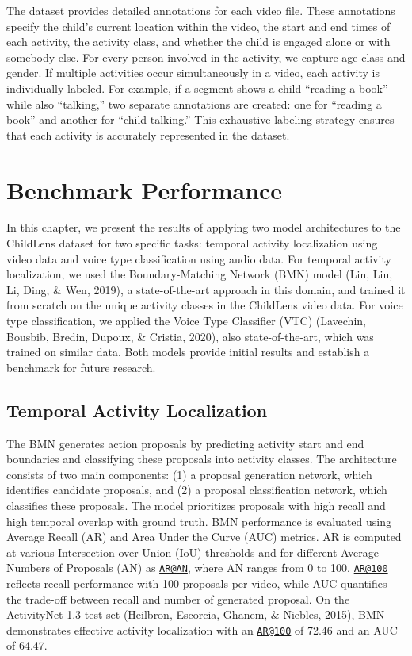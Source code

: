 \documentclass[
  man,floatsintext]{apa6}
\begin{document}
The dataset provides detailed annotations for each video file. These annotations specify the child's current location within the video, the start and end times of each activity, the activity class, and whether the child is engaged alone or with somebody else. For every person involved in the activity, we capture age class and gender. If multiple activities occur simultaneously in a video, each activity is individually labeled. For example, if a segment shows a child ``reading a book'' while also ``talking,'' two separate annotations are created: one for ``reading a book'' and another for ``child talking.'' This exhaustive labeling strategy ensures that each activity is accurately represented in the dataset.

\section{Benchmark Performance}\label{benchmark-performance}

In this chapter, we present the results of applying two model architectures to the ChildLens dataset for two specific tasks: temporal activity localization using video data and voice type classification using audio data. For temporal activity localization, we used the Boundary-Matching Network (BMN) model (Lin, Liu, Li, Ding, \& Wen, 2019), a state-of-the-art approach in this domain, and trained it from scratch on the unique activity classes in the ChildLens video data. For voice type classification, we applied the Voice Type Classifier (VTC) (Lavechin, Bousbib, Bredin, Dupoux, \& Cristia, 2020), also state-of-the-art, which was trained on similar data. Both models provide initial results and establish a benchmark for future research.

\subsection{Temporal Activity Localization}\label{temporal-activity-localization}

The BMN generates action proposals by predicting activity start and end boundaries and classifying these proposals into activity classes. The architecture consists of two main components: (1) a proposal generation network, which identifies candidate proposals, and (2) a proposal classification network, which classifies these proposals. The model prioritizes proposals with high recall and high temporal overlap with ground truth.
BMN performance is evaluated using Average Recall (AR) and Area Under the Curve (AUC) metrics. AR is computed at various Intersection over Union (IoU) thresholds and for different Average Numbers of Proposals (AN) as \href{mailto:AR@AN}{\nolinkurl{AR@AN}}, where AN ranges from 0 to 100. \href{mailto:AR@100}{\nolinkurl{AR@100}} reflects recall performance with 100 proposals per video, while AUC quantifies the trade-off between recall and number of generated proposal. On the ActivityNet-1.3 test set (Heilbron, Escorcia, Ghanem, \& Niebles, 2015), BMN demonstrates effective activity localization with an \href{mailto:AR@100}{\nolinkurl{AR@100}} of 72.46 and an AUC of 64.47.
\end{document}
